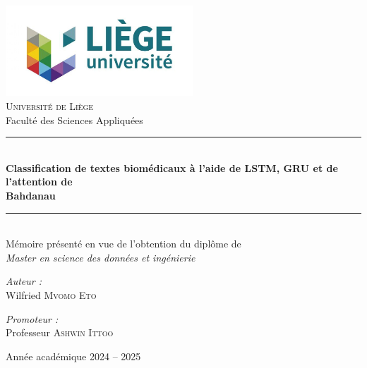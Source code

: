 \documentclass[12pt]{report}
\begin{document}
\sloppy

\begin{titlepage}
    \begin{center}
        \includegraphics[width=7cm]{uliege.jpg} \\[1cm]
        
        {\Huge \textsc{Université de Liège}} \\[0.5cm]
        {\Large Faculté des Sciences Appliquées} \\[2.5cm]
        
        \rule{\linewidth}{0.8mm} \\[0.4cm]
        
        {\LARGE \textbf{Classification de textes biomédicaux à l’aide de  LSTM, GRU et de l’attention de \\ Bahdanau}} \\[0.4cm]
        
        \rule{\linewidth}{0.8mm} \\[1cm]
        
        {\large 
         Mémoire présenté en vue de l’obtention du diplôme de \\[0.3cm]
        \textit{Master en science des données et ingénierie} \\[2cm]
        }
    \end{center}
    
    \vspace{-0.4cm}
    
    \begin{center}
        \begin{minipage}{0.45\textwidth}
            \flushleft
            \textit{Auteur :} \\[0.2cm]
            W\MakeLowercase{ilfried} \textsc{Mvomo Eto}
        \end{minipage}
        \begin{minipage}{0.45\textwidth}
            \flushright
            \textit{Promoteur :} \\[0.2cm]
            Professeur \textsc{Ashwin Ittoo}
        \end{minipage}
    \end{center}

    \vspace{4cm}
    \begin{center}
        {\small Année académique 2024 -- 2025}
    \end{center}
    
    \vfill
\end{titlepage}
\end{document}
